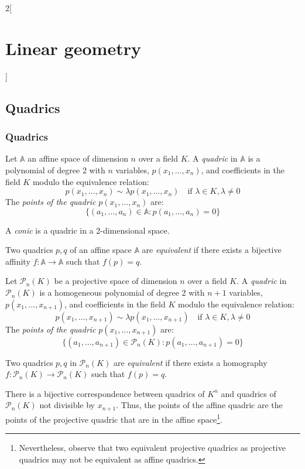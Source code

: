 \documentclass[../../../main_math.tex]{subfiles}
\begin{document}
\begin{multicols}{2}[\section{Linear geometry}]
  \subsection{Quadrics}
  \subsubsection{Quadrics}
  \begin{definition}
    Let $\mathbb{A}$ an affine space of dimension $n$ over a field $K$. A \emph{quadric} in $\mathbb{A}$ is a polynomial of degree 2 with $n$ variables, $p(x_1,\ldots,x_n)$, and coefficients in the field $K$ modulo the equivalence relation: $$p(x_1,\ldots,x_n)\sim\lambda p(x_1,\ldots,x_n)\quad\text{if }\lambda\in K,\lambda\ne0$$ The \emph{points of the quadric} $p(x_1,\ldots,x_n)$ are: $$\{(a_1,\ldots,a_n)\in\mathbb{A}:p(a_1,\ldots,a_n)=0\}$$
  \end{definition}
  \begin{definition}
    A \emph{conic} is a quadric in a 2-dimensional space.
  \end{definition}
  \begin{definition}
    Two quadrics $p,q$ of an affine space $\mathbb{A}$ are \emph{equivalent} if there exists a bijective affinity $f:\mathbb{A}\rightarrow\mathbb{A}$ such that $f(p)=q$.
  \end{definition}
  \begin{definition}
    Let $\mathcal{P}_n(K)$ be a projective space of dimension $n$ over a field $K$. A \emph{quadric} in $\mathcal{P}_n(K)$ is a homogeneous polynomial of degree 2 with $n+1$ variables, $p(x_1,\ldots,x_{n+1})$, and coefficients in the field $K$ modulo the equivalence relation: $$p(x_1,\ldots,x_{n+1})\sim\lambda p(x_1,\ldots,x_{n+1})\quad\text{if }\lambda\in K,\lambda\ne0$$ The \emph{points of the quadric} $p(x_1,\ldots,x_{n+1})$ are: $$\{(a_1,\ldots,a_{n+1})\in\mathcal{P}_n(K):p(a_1,\ldots,a_{n+1})=0\}$$
  \end{definition}
  \begin{definition}
    Two quadrics $p,q$ in $\mathcal{P}_n(K)$ are \emph{equivalent} if there exists a homography $f:\mathcal{P}_n(K)\rightarrow\mathcal{P}_n(K)$ such that $f(p)=q$.
  \end{definition}
  \begin{theorem}
    There is a bijective correspondence between quadrics of $K^n$ and quadrics of $\mathcal{P}_n(K)$ not divisible by $x_{n+1}$. Thus, the points of the affine quadric are the points of the projective quadric that are in the affine space\footnote{Nevertheless, observe that two equivalent projective quadrics as projective quadrics may not be equivalent as affine quadrics.}.

\end{theorem}
\end{multicols}
\end{document}
